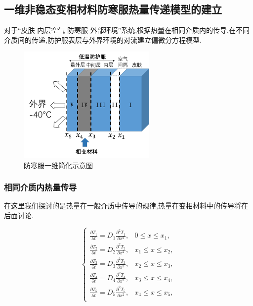 \documentclass{whutmod}
\begin{document}
\subsection{一维非稳态变相材料防寒服热量传递模型的建立}
对于“皮肤-内层空气-防寒服-外部环境”系统,根据热量在相同介质内的传导,在不同介质间的传递,防护服表层与外界环境的对流建立偏微分方程模型.
\begin{figure}[!htbp]
	\centering
	\includegraphics[width=0.6\textwidth]{yanshi.png}
	\caption{防寒服一维简化示意图}
	\label{shiyi}
\end{figure} 

\subsubsection{相同介质内热量传导}
在这里我们探讨的是热量在一般介质中传导的规律,热量在变相材料中的传导将在后面讨论.

\begin{equation}
	\begin{cases} 
	\frac{\partial T_{1}}{\partial t}=D_{1}\frac{\partial^{2}T_{1}}{\partial x^{2}},& 0\leq x \le x_{1},\\
	\frac{\partial T_{2}}{\partial t}=D_{2}\frac{\partial^{2}T_{2}}{\partial x^{2}},& x_{1}\leq x \le x_{2},\\
      \frac{\partial T_{3}}{\partial t}=D_{3}\frac{\partial^{2}T_{3}}{\partial x^{2}},& x_{2}\leq x \le x_{3},\\
      \frac{\partial T_{4}}{\partial t}=D_{4}\frac{\partial^{2}T_{4}}{\partial x^{2}},& x_{3}\leq x \le x_{4},\\
      \frac{\partial T_{5}}{\partial t}=D_{5}\frac{\partial^{2}T_{5}}{\partial x^{2}},& x_{4}\leq x \le x_{5},\\
	\end{cases}
\end{equation}
\end{document}
